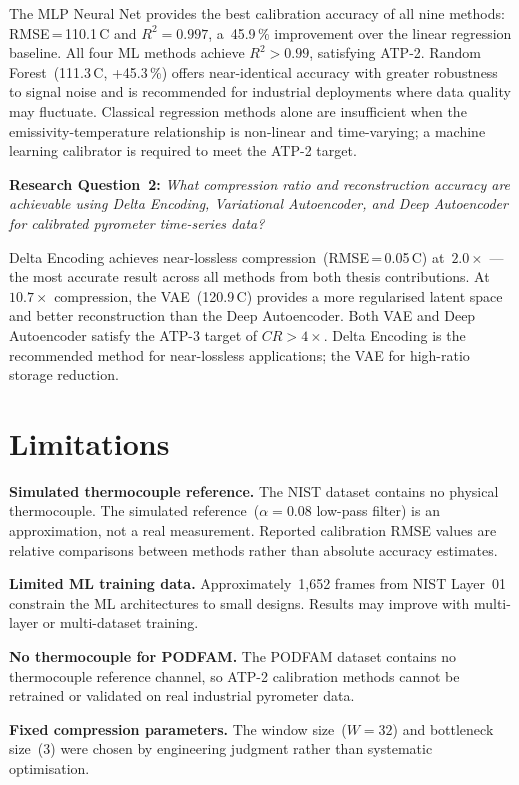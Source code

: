 The MLP Neural Net provides the best calibration accuracy of all nine methods: RMSE\,=\,110.1\,\textdegree C and $R^2 = 0.997$, a~45.9\,\% improvement over the linear regression baseline. All four ML methods achieve $R^2 > 0.99$, satisfying ATP-2. Random Forest~(111.3\,\textdegree C, +45.3\,\%) offers near-identical accuracy with greater robustness to signal noise and is recommended for industrial deployments where data quality may fluctuate. Classical regression methods alone are insufficient when the emissivity-temperature relationship is non-linear and time-varying; a machine learning calibrator is required to meet the ATP-2 target.

\textbf{Research Question~2:} \textit{What compression ratio and reconstruction accuracy are achievable using Delta Encoding, Variational Autoencoder, and Deep Autoencoder for calibrated pyrometer time-series data?}

Delta Encoding achieves near-lossless compression~(RMSE\,=\,0.05\,\textdegree C) at~$2.0\times$ --- the most accurate result across all methods from both thesis contributions. At~$10.7\times$ compression, the VAE~(120.9\,\textdegree C) provides a more regularised latent space and better reconstruction than the Deep Autoencoder. Both VAE and Deep Autoencoder satisfy the ATP-3 target of $CR > 4\times$. Delta Encoding is the recommended method for near-lossless applications; the VAE for high-ratio storage reduction.

\section{Limitations}
\label{sec:limitations-ch6}

\textbf{Simulated thermocouple reference.} The NIST dataset contains no physical thermocouple. The simulated reference~($\alpha=0.08$ low-pass filter) is an approximation, not a real measurement. Reported calibration RMSE values are relative comparisons between methods rather than absolute accuracy estimates.

\textbf{Limited ML training data.} Approximately~1,652 frames from NIST Layer~01 constrain the ML architectures to small designs. Results may improve with multi-layer or multi-dataset training.

\textbf{No thermocouple for PODFAM.} The PODFAM dataset contains no thermocouple reference channel, so ATP-2 calibration methods cannot be retrained or validated on real industrial pyrometer data.

\textbf{Fixed compression parameters.} The window size~($W=32$) and bottleneck size~(3) were chosen by engineering judgment rather than systematic optimisation.

